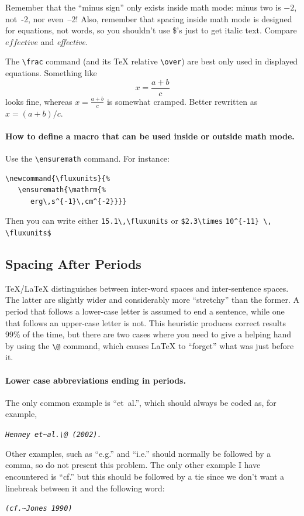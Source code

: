 \documentclass[debug]{rmaa}
\newcommand{\CS}[1]{\texttt{\textbackslash #1}}
\newenvironment{Example}
{\begin{list}{}{\setlength{\leftmargin}{10pt}\setlength{\rightmargin}{10pt}}%
  \item[]\itshape}
  {\end{list}}
\begin{document}
Remember that the ``minus sign'' only exists inside math mode: minus
two is $-2$, not~-2, nor \hbox{even --2!} Also, remember that spacing inside
math mode is designed for equations, not words, so you shouldn't use
\$'s just to get italic text. Compare $effective$ and
\textit{effective}. 

The \CS{frac} command (and its \TeX{} relative \CS{over}) are best
only used in displayed equations. Something like 
\begin{equation}
  \label{eq:one}
  x = \frac { a + b } { c } 
\end{equation}
looks fine, whereas $x = \frac { a + b } { c }$ is somewhat cramped.
Better rewritten as $x = (a + b) / c $. 

\paragraph{How to define a macro that can be used inside or outside
  math mode.} Use the \CS{ensuremath} command. For instance: 
\begin{verbatim}
\newcommand{\fluxunits}{%
   \ensuremath{\mathrm{%
      erg\,s^{-1}\,cm^{-2}}}}
\end{verbatim}
Then you can write either \verb+15.1\,\fluxunits+ or
\verb+$2.3\times+ \verb+10^{-11} \,+ \verb+\fluxunits$+


\subsection{Spacing After Periods}
\label{sec:space}

\TeX{}/\LaTeX{} distinguishes between inter-word spaces and
inter-sentence spaces. The latter are slightly wider and considerably
more ``stretchy'' than the former. A period that follows a lower-case
letter is assumed to end a sentence, while one that follows an
upper-case letter is not.  This heuristic produces correct results
99\% of the time, but there are two cases where you need to give a
helping hand by using the \verb+\@+ command, which causes \LaTeX{} to
``forget'' what was just before it. 


\paragraph{Lower case abbreviations ending in periods.} The only common
example is ``et~al.\@'', which should always be coded as, for example,
\begin{Example}
  \verb+Henney et~al.\@ (2002).+
\end{Example} 
Other examples, such as ``e.g.\@'' and ``i.e.\@'' should normally be
followed by a comma, so do not present this problem. The only other
example I have encountered is ``cf.\@'' but this should be followed by
a tie since we don't want a linebreak between it and the following
word:
\begin{Example}
  \verb+(cf.~Jones 1990)+
\end{Example}
\end{document}
